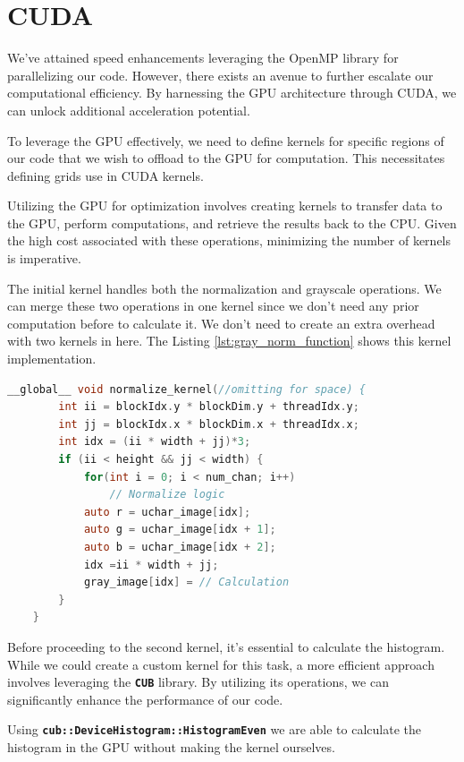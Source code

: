 \documentclass[sigconf]{acmart}
\begin{document}
\section{CUDA}
We've attained speed enhancements leveraging the OpenMP library for parallelizing our code. However, there exists an avenue to further escalate our computational efficiency. By harnessing the GPU architecture through CUDA, we can unlock additional acceleration potential.

To leverage the GPU effectively, we need to define kernels for specific regions of our code that we wish to offload to the GPU for computation. This necessitates defining grids use in CUDA kernels.

Utilizing the GPU for optimization involves creating kernels to transfer data to the GPU, perform computations, and retrieve the results back to the CPU. Given the high cost associated with these operations, minimizing the number of kernels is imperative.

The initial kernel handles both the normalization and grayscale operations. We can merge these two operations in one kernel since we don't need any prior computation before to calculate it. We don't need to create an extra overhead with two kernels in here. The Listing \ref{lst:gray_norm_function} shows this kernel implementation.

\begin{lstlisting}[language=C, caption=Grey Conversion and Normalization, label={lst:gray_norm_function}]
__global__ void normalize_kernel(//omitting for space) {
        int ii = blockIdx.y * blockDim.y + threadIdx.y;
        int jj = blockIdx.x * blockDim.x + threadIdx.x;
        int idx = (ii * width + jj)*3;
        if (ii < height && jj < width) {
            for(int i = 0; i < num_chan; i++) 
                // Normalize logic
            auto r = uchar_image[idx];
            auto g = uchar_image[idx + 1];
            auto b = uchar_image[idx + 2];
            idx =ii * width + jj;
            gray_image[idx] = // Calculation
        }
    }
\end{lstlisting}

Before proceeding to the second kernel, it's essential to calculate the histogram. While we could create a custom kernel for this task, a more efficient approach involves leveraging the \texttt{\textbf{CUB}} library. By utilizing its operations, we can significantly enhance the performance of our code.

Using \texttt{\textbf{cub::DeviceHistogram::HistogramEven}} we are able to calculate the histogram in the GPU without making the kernel ourselves.
\end{document}
